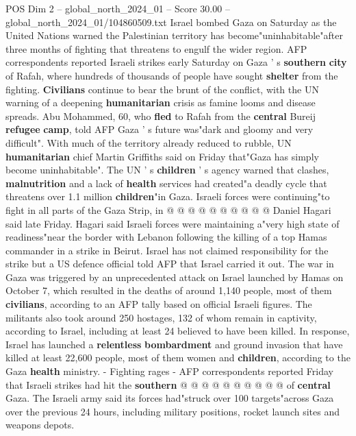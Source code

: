 \begin{textsample}{POS Dim 2 – global\_north\_2024\_01 – Score 30.00 – global\_north\_2024\_01/104860509.txt}  \label{ex:f2_pos_210}
Israel bombed Gaza on Saturday as the United Nations warned the Palestinian territory has become"uninhabitable"after three months of fighting that threatens to engulf the wider region.
AFP correspondents reported Israeli strikes early Saturday on Gaza ' s \textbf{southern} \textbf{city} of Rafah, where hundreds of thousands of people have sought \textbf{shelter} from the fighting. \textbf{Civilians} continue to bear the brunt of the conflict, with the UN warning of a deepening \textbf{humanitarian} crisis as famine looms and disease spreads.
Abu Mohammed, 60, who \textbf{fled} to Rafah from the \textbf{central} Bureij \textbf{refugee} \textbf{camp}, told AFP Gaza ' s future was"dark and gloomy and very difficult".
With much of the territory already reduced to rubble, UN \textbf{humanitarian} chief Martin Griffiths said on Friday that"Gaza has simply become uninhabitable".
The UN ' s \textbf{children} ' s agency warned that clashes, \textbf{malnutrition} and a lack of \textbf{health} services had created"a deadly cycle that threatens over 1.1 million \textbf{children}"in Gaza.
Israeli forces were continuing"to fight in all parts of the Gaza Strip, in @ @ @ @ @ @ @ @ @ @ Daniel Hagari said late Friday.
Hagari said Israeli forces were maintaining a"very high state of readiness"near the border with Lebanon following the killing of a top Hamas commander in a strike in Beirut.
Israel has not claimed responsibility for the strike but a US defence official told AFP that Israel carried it out.
The war in Gaza was triggered by an unprecedented attack on Israel launched by Hamas on October 7, which resulted in the deaths of around 1,140 people, most of them \textbf{civilians}, according to an AFP tally based on official Israeli figures.
The militants also took around 250 hostages, 132 of whom remain in captivity, according to Israel, including at least 24 believed to have been killed.
In response, Israel has launched a \textbf{relentless} \textbf{bombardment} and ground invasion that have killed at least 22,600 people, most of them women and \textbf{children}, according to the Gaza \textbf{health} ministry. - Fighting rages - AFP correspondents reported Friday that Israeli strikes had hit the \textbf{southern} @ @ @ @ @ @ @ @ @ @ of \textbf{central} Gaza.
The Israeli army said its forces had"struck over 100 targets"across Gaza over the previous 24 hours, including military positions, rocket launch sites and weapons depots.

\end{textsample}
